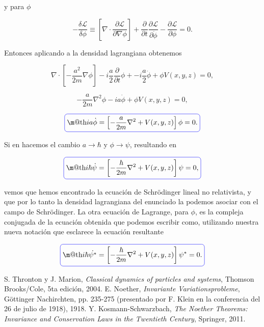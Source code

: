 \documentclass[a4paper,10pt]{article}
\makeatletter
\numberwithin{equation}{section}
\newcommand*{\boxcolor}{blue}
\renewcommand{\boxed}[1]{\textcolor{\boxcolor}{%
\tikz[baseline={([yshift=-1ex]current bounding box.center)}] \node [rectangle, minimum width=1ex,rounded corners,draw] {\normalcolor\m@th$\displaystyle#1$};}}
\makeatother
\begin{document}
y para $\phi$ 

\begin{equation}
 - \frac{\delta\mathcal{L}}{\delta \phi} \equiv 
 \left[ \nabla \cdot \frac{\partial \mathcal{L}}{\partial \nabla \phi} \right] 
 + \frac{\partial}{\partial t}\frac{\partial \mathcal{L}}{\partial \dot{\phi}} 
 - \frac{\partial \mathcal{L}}{\partial \phi} = 0.
 \label{eq:shro2}
\end{equation}

Entonces aplicando  a la densidad lagrangiana obtenemos 

\begin{equation}
 \nabla \cdot \left[ - \frac{a^2}{2m}\nabla\phi \right] - 
 i\frac{a}{2}\frac{\partial}{\partial t} \phi + - i\frac{a}{2}\dot{\phi} + 
 \phi V(x,y,z) = 0,
\end{equation}

\begin{equation}
 -\frac{a}{2m}\nabla^2 \phi - ia\dot{\phi} + \phi V(x,y,z) = 0,
\end{equation}

\begin{equation}
 \boxed{ia\dot{\phi} = \left[-\frac{a}{2m}\nabla^2 + V(x,y,z)\right]\phi = 0.}
 \label{eq:shro3}
\end{equation}

Si en  hacemos el cambio $a \rightarrow \hbar$ y $\phi \rightarrow \psi$, 
resultando en

\begin{equation}
 \boxed{i\hbar\dot{\psi} = \left[-\frac{\hbar}{2m}\nabla^2 + V(x,y,z)\right]\psi = 0,}
 \label{eq:shro4}
\end{equation}

vemos que hemos encontrado la ecuación de Schrödinger lineal no relativista, y que 
por lo tanto la densidad lagrangiana del enunciado la podemos asociar con el 
campo de Schrödinger. La otra ecuación de Lagrange, para $\phi$, es la compleja 
conjugada de la ecuación obtenida que podemos escribir como, utilizando nuestra 
nueva notación que esclarece la ecuación resultante


\begin{equation}
 \boxed{i\hbar\dot{\psi^*} = \left[-\frac{\hbar}{2m}\nabla^2 + V(x,y,z)\right]\psi^* = 0.}
 \label{eq:shro5}
\end{equation}






\begin{thebibliography}{10}
 S. Thronton y J. Marion, \textit{Classical dynamics of particles and systems}, Thomson Brooks/Cole,
 5ta edición, 2004.
E. Noether, \emph{Invariante Variationsprobleme}, Göttinger Nachirchten, pp. 235-275
(presentado por F. Klein en la conferencia del 26 de julio de 1918), 1918.
Y. Kosmann-Schwarzbach, \emph{The Noether Theorems: Invariance and Conservation Laws 
in the Twentieth Century}, Springer, 2011.


\end{thebibliography}
\end{document}
